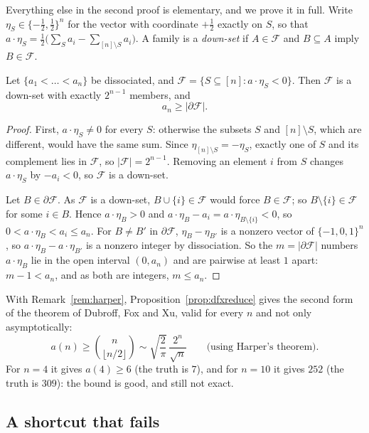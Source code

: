 Everything else in the second proof is elementary, and we prove it in full. Write $\eta_S\in\{-\frac12,\frac12\}^n$ for the vector with coordinate $+\frac12$ exactly on $S$, so that
$a\cdot\eta_S=\frac12\bigl(\sum_Sa_i-\sum_{[n]\setminus S}a_i\bigr)$. A family is a \emph{down-set} if $A\in\mathcal F$ and $B\subseteq A$ imply $B\in\mathcal F$.

\begin{proposition}\label{prop:dfxreduce}
Let $\{a_1<\dots<a_n\}$ be dissociated, and $\mathcal F=\{S\subseteq[n]:a\cdot\eta_S<0\}$. Then $\mathcal F$ is a down-set with exactly $2^{n-1}$ members, and
\[
a_n\ge|\partial\mathcal F|.
\]
\end{proposition}

\begin{proof}
First, $a\cdot\eta_S\ne0$ for every $S$: otherwise the subsets $S$ and $[n]\setminus S$, which are different, would have the same sum. Since $\eta_{[n]\setminus S}=-\eta_S$, exactly one of
$S$ and its complement lies in $\mathcal F$, so $|\mathcal F|=2^{n-1}$. Removing an element $i$ from $S$ changes $a\cdot\eta_S$ by $-a_i<0$, so $\mathcal F$ is a down-set.

Let $B\in\partial\mathcal F$. As $\mathcal F$ is a down-set, $B\cup\{i\}\in\mathcal F$ would force $B\in\mathcal F$; so $B\setminus\{i\}\in\mathcal F$ for some $i\in B$. Hence $a\cdot\eta_B>0$ and
$a\cdot\eta_B-a_i=a\cdot\eta_{B\setminus\{i\}}<0$, so $0<a\cdot\eta_B<a_i\le a_n$. For $B\ne B'$ in $\partial\mathcal F$, $\eta_B-\eta_{B'}$ is a nonzero vector of $\{-1,0,1\}^n$, so $a\cdot\eta_B-a\cdot\eta_{B'}$ is a
nonzero integer by dissociation. So the $m=|\partial\mathcal F|$ numbers $a\cdot\eta_B$ lie in the open interval $(0,a_n)$ and are pairwise at least $1$ apart: $m-1<a_n$, and as both are
integers, $m\le a_n$.
\end{proof}

With Remark~\ref{rem:harper}, Proposition~\ref{prop:dfxreduce} gives the second form of the theorem of Dubroff, Fox and Xu, valid for every $n$ and not only asymptotically:
\[
a(n)\ge\binom n{\lfloor n/2\rfloor}\sim\sqrt{\frac2\pi}\,\frac{2^n}{\sqrt n}\qquad\text{(using Harper's theorem).}
\]
For $n=4$ it gives $a(4)\ge6$ (the truth is $7$), and for $n=10$ it gives $252$ (the truth is $309$): the bound is good, and still not exact.

\subsection*{A shortcut that fails}


